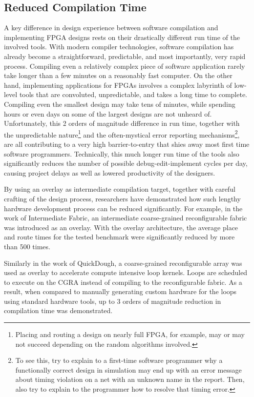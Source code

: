 \subsection{Reduced Compilation Time}
A key difference in design experience between software compilation and implementing FPGA designs rests on their drastically different run time of the involved tools.
With modern compiler technologies, software compilation has already become a straightforward, predictable, and most importantly, very rapid process.
Compiling even a relatively complex piece of software application rarely take longer than a few minutes on a reasonably fast computer.
On the other hand, implementing applications for FPGAs involves a complex labyrinth of low-level tools that are convoluted, unpredictable, and takes a long time to complete.
Compiling even the smallest design may take tens of minutes, while spending hours or even days on some of the largest designs are not unheard of.
Unfortunately, this 2 orders of magnitude difference in run time, together with the unpredictable nature\footnote{Placing and routing a design on nearly full FPGA, for example, may or may not succeed depending on the random algorithms involved.} and the often-mystical error reporting mechanisms\footnote{To see this, try to explain to a first-time software programmer why a functionally correct design in simulation may end up with an error message about timing violation on a net with an unknown name in the report.  Then, also try to explain to the programmer how to resolve that timing error.}, are all contributing to a very high barrier-to-entry that shies away most first time software programmers.
Technically, this much longer run time of the tools also significantly reduces the number of possible debug-edit-implement cycles per day, causing project delays as well as lowered productivity of the designers.

By using an overlay as intermediate compilation target, together with careful crafting of the design process, researchers have demonstrated how such lengthy hardware development process can be reduced significantly.
For example, in the work of Intermediate Fabric\cite{Coole2010Intermediate}, an intermediate coarse-grained reconfigurable fabric was introduced as an overlay.
With the overlay architecture, the average place and route times for the tested benchmark were significantly reduced by more than 500 times.

Similarly in the work of QuickDough, a coarse-grained reconfigurable array was used as overlay to accelerate compute intensive loop kernels.  Loops are scheduled to execute on the CGRA instead of compiling to the reconfigurable fabric.  As a result, when compared to manually generating custom hardware for the loops using standard hardware tools, up to 3 orders of magnitude reduction in compilation time was demonstrated.

